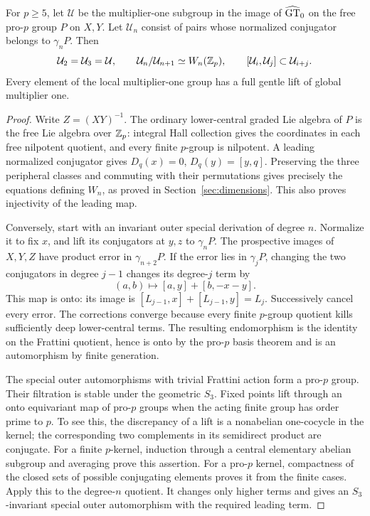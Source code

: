 \begin{lemma}\label{lem:realization}
For $p\geq5$, let $\mathcal U$ be the multiplier-one subgroup in the
image of $\widehat{\mathrm{GT}}_0$ on the free pro-$p$ group $P$ on $X,Y$.
Let $\mathcal U_n$ consist of pairs whose normalized conjugator belongs
to $\gamma_nP$.  Then
\[
 \mathcal U_2=\mathcal U_3=\mathcal U,
 \qquad \mathcal U_n/\mathcal U_{n+1}\simeq W_n(\mathbb Z_p),
 \qquad [\mathcal U_i,\mathcal U_j]\subset\mathcal U_{i+j}.
\]
Every element of the local multiplier-one group has a full gentle lift
of global multiplier one.
\end{lemma}
\begin{proof}
Write $Z=(XY)^{-1}$.  The ordinary lower-central graded Lie algebra of
$P$ is the free Lie algebra over $\mathbb Z_p$: integral Hall collection gives
the coordinates in each free nilpotent quotient, and every finite
$p$-group is nilpotent.  A leading normalized conjugator gives
$D_q(x)=0$, $D_q(y)=[y,q]$.  Preserving the three peripheral classes
and commuting with their permutations gives precisely the equations
defining $W_n$, as proved in Section~\ref{sec:dimensions}.  This also
proves injectivity of the leading map.

Conversely, start with an invariant outer special derivation of degree
$n$.  Normalize it to fix $x$, and lift its conjugators at $y,z$ to
$\gamma_nP$.  The prospective images of $X,Y,Z$ have product error in
$\gamma_{n+2}P$.  If the error lies in $\gamma_jP$, changing the two
conjugators in degree $j-1$ changes its degree-$j$ term by
\[
 (a,b)\longmapsto[a,y]+[b,-x-y].
\]
This map is onto: its image is $[L_{j-1},x]+[L_{j-1},y]=L_j$.
Successively cancel every error.  The corrections converge because
every finite $p$-group quotient kills sufficiently deep lower-central
terms.  The resulting endomorphism is the identity on the Frattini
quotient, hence is onto by the pro-$p$ basis theorem and is an
automorphism by finite generation.

The special outer automorphisms with trivial Frattini action form a
pro-$p$ group.  Their filtration is stable under the geometric $S_3$.
Fixed points lift through an onto equivariant map of pro-$p$ groups
when the acting finite group has order prime to $p$.  To see this,
the discrepancy of a lift is a nonabelian one-cocycle in the kernel;
the corresponding two complements in its semidirect product are
conjugate.  For a finite $p$-kernel, induction through a central
elementary abelian subgroup and averaging prove this assertion.
For a pro-$p$ kernel, compactness of the closed sets of possible
conjugating elements proves it from the finite cases.  Apply this to
the degree-$n$ quotient.  It changes only higher terms and gives an
$S_3$-invariant special outer automorphism with the required leading term.


\end{proof}
